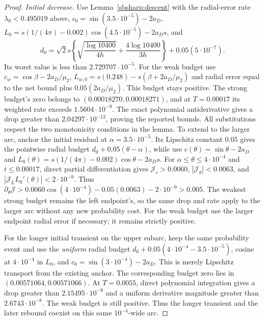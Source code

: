 \documentclass{article} %
\theoremstyle{plain}
\theoremstyle{definition}
\theoremstyle{remark}
\begin{document}
\begin{proof}
\emph{Initial decrease.}
Use Lemma~\ref{sbsharp:descent} with the radial-error rate $\lambda_0<0.495019$ above,
$c_0=\sin(3.5\cdot10^{-5})-2a_D$,
$L_0=s(1/(4\pi)-0.002)\cos(4.5\cdot10^{-5})-2a_Ds$,
and
\[
 d_0=\sqrt2s\left\{\sqrt{\frac{\log10400}{4h}}
        +\frac{4\log10400}{3h}\right\}+0.05(5\cdot10^{-7}).
\]
Its worst value is less than $2.729707\cdot10^{-5}$.
For the weak budget use
$c_w=\cos\beta-2a_D/\mu_2$,
$L_{w,0}=s(0.248)-s(\beta+2a_D/\mu_2)$ and radial error equal to the
net bound plus $0.05(2a_D/\mu_2)$. This budget stays positive.
The strong budget's zero belongs to
$(0.00018270,0.00018271)$, and at $T=0.00017$ its weighted rate exceeds
$1.5604\cdot10^{-9}$. The exact polynomial antiderivative gives a
drop greater than $2.04297\cdot10^{-12}$, proving the reported bounds.
All substitutions respect the two monotonicity conditions in the lemma.
To extend to the larger arc, anchor the initial residual at
$\alpha=3.5\cdot10^{-5}$. Its Lipschitz constant $0.05$ gives the
pointwise radial budget $d_0+0.05(\theta-\alpha)$, while use
$c(\theta)=\sin\theta-2a_D$ and
$L_0(\theta)=s(1/(4\pi)-0.002)\cos\theta-2a_Ds$.
For $\alpha\le\theta\le4\cdot10^{-4}$ and $t\le0.00017$, direct
partial differentiation gives
$\mathcal J_c>0.0060$, $|\mathcal J_d|<0.0063$, and
$|\mathcal J_L L_0'(\theta)|<2\cdot10^{-9}$.
Thus $\partial_\theta\mathcal J>0.0060\cos(4\cdot10^{-4})
-0.05(0.0063)-2\cdot10^{-9}>0.005$.
The weakest strong budget remains the left endpoint's, so the same
drop and rate apply to the larger arc without any new probability cost.
For the weak budget use the larger endpoint radial error if necessary;
it remains strictly positive.

For the longer initial transient on the upper subarc, keep the same
probability event and use the \emph{uniform} radial budget
$d_0+0.05(4\cdot10^{-4}-3.5\cdot10^{-5})$, cosine at
$4\cdot10^{-4}$ in $L_0$, and $c_0=\sin(3\cdot10^{-4})-2a_D$.
This is merely Lipschitz transport from the existing anchor.
The corresponding budget zero lies in $(0.00571064,0.00571066)$.
At $T=0.0055$, direct polynomial integration gives a drop greater than
$2.15495\cdot10^{-9}$ and a uniform derivative magnitude greater than
$2.6743\cdot10^{-8}$. The weak budget is still positive. Thus the longer
transient and the later rebound coexist on this same $10^{-4}$-wide arc.


\end{proof}
\end{document}
